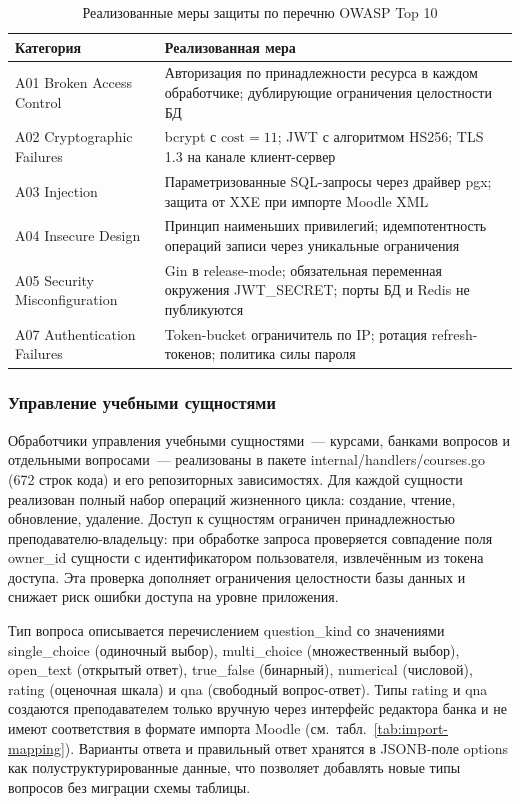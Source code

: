 \begin{table}[!htb]
\fontsize{11pt}{13pt}\selectfont
\centering
\caption{Реализованные меры защиты по перечню OWASP Top 10}
\label{tab:security-owasp}
\smallskip
\begin{tabular}{|p{3.0cm}|p{10.5cm}|}
    \hline
    \textbf{Категория} & \textbf{Реализованная мера} \\
    \hline
        A01 Broken Access Control & Авторизация по принадлежности ресурса в каждом обработчике; дублирующие ограничения целостности БД \\
    \hline
        A02 Cryptographic Failures & bcrypt с $\text{cost}=11$; JWT с алгоритмом HS256; TLS 1.3 на канале клиент-сервер \\
    \hline
        A03 Injection            & Параметризованные SQL-запросы через драйвер pgx; защита от XXE при импорте Moodle XML \\
    \hline
        A04 Insecure Design      & Принцип наименьших привилегий; идемпотентность операций записи через уникальные ограничения \\
    \hline
        A05 Security Misconfiguration & Gin в release-mode; обязательная переменная окружения JWT\_SECRET; порты БД и Redis не публикуются \\
    \hline
        A07 Authentication Failures & Token-bucket ограничитель по IP; ротация refresh-токенов; политика силы пароля \\
    \hline
\end{tabular}
\end{table}
\FloatBarrier

\subsubsection{Управление учебными сущностями}

Обработчики управления учебными сущностями~--- курсами, банками
вопросов и отдельными вопросами~--- реализованы в пакете
internal/handlers/courses.go (672 строк кода) и его репозиторных
зависимостях. Для каждой сущности реализован полный набор операций
жизненного цикла: создание, чтение, обновление, удаление. Доступ
к сущностям ограничен принадлежностью преподавателю-владельцу: при
обработке запроса проверяется совпадение поля owner\_id
сущности с идентификатором пользователя, извлечённым из токена
доступа. Эта проверка дополняет ограничения целостности базы
данных и снижает риск ошибки доступа на уровне приложения.

Тип вопроса описывается перечислением question\_kind со
значениями single\_choice (одиночный выбор), multi\_choice
(множественный выбор), open\_text (открытый ответ),
true\_false (бинарный), numerical (числовой), rating
(оценочная шкала) и qna (свободный вопрос-ответ). Типы
rating и qna создаются преподавателем только вручную через
интерфейс редактора банка и не имеют соответствия в формате
импорта Moodle (см.~табл.~\ref{tab:import-mapping}). Варианты
ответа и правильный ответ хранятся в JSONB-поле options
как полуструктурированные данные, что позволяет добавлять новые
типы вопросов без миграции схемы таблицы.

